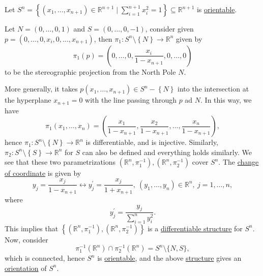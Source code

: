 \begin{eg}
	Let \(S^n = \left\{ (x_1, \dots , x_{n+1})\in \mathbb{R} ^{n+1} \mid \sum_{i=1}^{n+1} x_i^2 = 1 \right\} \subseteq \mathbb{R} ^{n+1}\) is \hyperref[def:orientable]{orientable}.
\end{eg}
\begin{explanation}
	Let \(N=(0, \dots , 0, 1)\) and \(S=(0, \dots , 0, -1)\), consider given \(p=(0, \dots , 0, x_i, 0, \dots , x_{n+1} )\), then \(\pi _1\colon S^n \setminus \left\{ N \right\} \to \mathbb{R} ^n\) given by
	\[
		\pi _1(p) = \left( 0, \dots , 0, \frac{x_i}{1-x_{n+1}}, 0, \dots , 0 \right)
	\]
	to be the stereographic projection from the North Pole \(N\).

	\begin{center}
	\end{center}

	More generally, it takes \(p(x_1, \dots , x_{n+1})\in S^{n}-\left\{ N \right\}\) into the intersection at the hyperplane \(x_{n+1}= 0\) with the line passing through \(p\) ad \(N\). In this way, we have
	\[
		\pi _1(x_1, \dots , x_n) = \left( \frac{x_1}{1-x_{n+1}}, \frac{x_2}{1-x_{n+1}}, \dots , \frac{x_n}{1-x_{n+1}} \right),
	\]
	hence \(\pi _1\colon S^n \setminus \left\{ N \right\} \to \mathbb{R} ^n\) is differentiable, and is injective. Similarly, \(\pi _2\colon S^n \setminus \left\{ S \right\} \to \mathbb{R} ^n\) for \(S\) can also be defined and everything holds similarly. We see that these two parametrizations \((\mathbb{R} ^n, \pi _1 ^{-1} ), (\mathbb{R} ^n, \pi _2 ^{-1} )\) cover \(S^n\). The \hyperref[def:coordinate-transition]{change of coordinate} is given by
	\[
		y_j = \frac{x_j}{1 - x_{n+1}} \leftrightarrow y_j^\prime = \frac{x_j}{1 + x_{n+1}},\ (y_1, \dots , y_n) \in \mathbb{R} ^n,\ j = 1, \dots , n,
	\]
	where
	\[
		y_j ^\prime = \frac{y_j}{\sum_{i=1}^n y_i ^2}.
	\]
	This implies that \(\left\{ (\mathbb{R} ^n, \pi _1 ^{-1} ), (\mathbb{R} ^n, \pi _2 ^{-1} ) \right\} \) is a \hyperref[def:smooth-structure]{differentiable structure} for \(S^n\). Now, consider
	\[
		\pi _1 ^{-1} (\mathbb{R} ^n) \cap \pi _2 ^{-1} (\mathbb{R} ^n) = S^n \setminus \{ N , S \},
	\]
	which is connected, hence \(S^n\) is \hyperref[def:orientable]{orientable}, and the above \hyperref[def:smooth-structure]{structure} gives an \hyperref[def:orientation]{orientation} of \(S^n\).
\end{explanation}